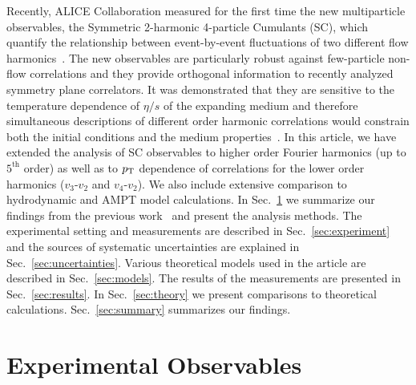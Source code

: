 Recently, ALICE Collaboration measured for the first time the new multiparticle observables, the Symmetric 2-harmonic 4-particle Cumulants (SC), which quantify the relationship between event-by-event fluctuations of two different flow harmonics~\cite{ALICE:2016kpq}. 
The new observables are particularly robust against few-particle non-flow correlations and they provide orthogonal information to recently analyzed symmetry plane correlators. 
It was demonstrated that they are sensitive to the temperature dependence of $\eta/s$ of the expanding medium and therefore simultaneous descriptions of different order harmonic correlations would constrain both the initial conditions and the medium properties~\cite{ALICE:2016kpq,Zhu:2016puf}.
In this article, we have extended the analysis of SC observables to higher order Fourier harmonics (up to $5^{\mathrm{th}}$ order) as well as to $p_{\rm T}$ dependence of correlations for the lower order harmonics ($v_3$-$v_2$ and $v_4$-$v_2$).  We also include extensive comparison to hydrodynamic and AMPT model calculations.
In Sec.~\ref{sec:method} we summarize our findings from the previous work~\cite{ALICE:2016kpq} and present the analysis methods. The experimental setting and measurements are described in Sec.~\ref{sec:experiment} and the sources of systematic uncertainties are explained in Sec.~\ref{sec:uncertainties}. Various theoretical models used in the article are described in Sec.~\ref{sec:models}. The results of the measurements are presented in Sec.~\ref{sec:results}.
 In Sec.~\ref{sec:theory} we present comparisons to theoretical calculations. Sec.~\ref{sec:summary} summarizes our findings.
 
 

\section{Experimental Observables}
\label{sec:method}

